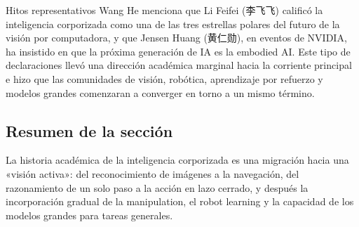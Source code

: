 \begin{importantbox}{Hitos representativos}
Wang He menciona que Li Feifei (李飞飞) calificó la inteligencia corporizada como una de las tres estrellas polares del futuro de la visión por computadora, y que Jensen Huang (黄仁勋), en eventos de NVIDIA, ha insistido en que la próxima generación de IA es la embodied AI. Este tipo de declaraciones llevó una dirección académica marginal hacia la corriente principal e hizo que las comunidades de visión, robótica, aprendizaje por refuerzo y modelos grandes comenzaran a converger en torno a un mismo término.
\end{importantbox}

\subsection{Resumen de la sección}

La historia académica de la inteligencia corporizada es una migración hacia una «visión activa»: del reconocimiento de imágenes a la navegación, del razonamiento de un solo paso a la acción en lazo cerrado, y después la incorporación gradual de la manipulation, el robot learning y la capacidad de los modelos grandes para tareas generales.
